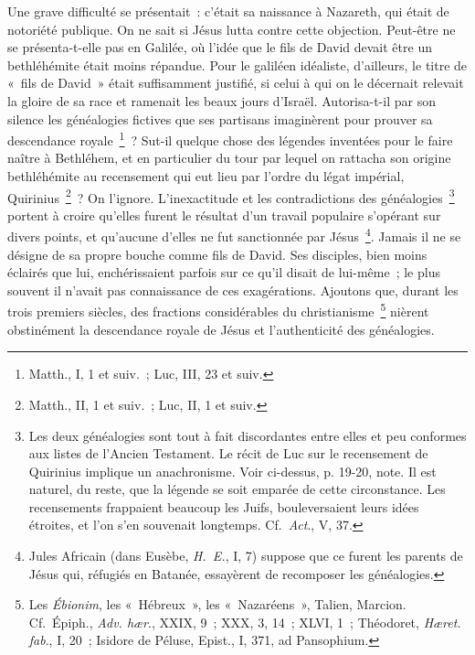 \documentclass[french,twoside]{book} %
\begin{document}
Une grave difficulté se présentait : c’était sa naissance à Nazareth, qui était de notoriété publique. On ne sait si Jésus lutta contre cette objection. Peut-être ne se présenta-t-elle pas en Galilée, où l’idée que le fils de David devait être un bethléhémite était moins répandue. Pour le galiléen idéaliste, d’ailleurs, le titre de « fils de David » était suffisamment justifié, si celui à qui on le décernait relevait la gloire de sa race et ramenait les beaux jours d’Israël. Autorisa-t-il par son silence les généalogies fictives que ses partisans imaginèrent pour prouver sa descendance royale \footnote{Matth., I, 1 et suiv. ; Luc, III, 23 et suiv.} ? Sut-il quelque chose des légendes inventées pour le faire naître à Bethléhem, et en particulier du tour par lequel on rattacha son origine bethléhémite au recensement qui eut lieu par l’ordre du légat impérial, Quirinius \footnote{Matth., II, 1 et suiv. ; Luc, II, 1 et suiv.} ? On l’ignore. L’inexactitude et les contradictions des généalogies \footnote{ Les deux généalogies sont tout à fait discordantes entre elles et peu conformes aux listes de l’Ancien Testament. Le récit de Luc sur le recensement de Quirinius implique un anachronisme. Voir ci-dessus, p. 19-20, note. Il est naturel, du reste, que la légende se soit emparée de cette circonstance. Les recensements frappaient beaucoup les Juifs, bouleversaient leurs idées étroites, et l’on s’en souvenait longtemps. Cf. {\itshape Act}., V, 37.} portent à croire qu’elles furent le résultat d’un travail populaire s’opérant sur divers points, et qu’aucune d’elles ne fut sanctionnée par Jésus \footnote{ Jules Africain (dans Eusèbe, {\itshape H. E.}, I, 7) suppose que ce furent les parents de Jésus qui, réfugiés en Batanée, essayèrent de recomposer les généalogies.}. Jamais il ne se désigne de sa propre bouche comme fils de David. Ses disciples, bien moins éclairés que lui, enchérissaient parfois sur ce qu’il disait de lui-même ; le plus souvent il n’avait pas connaissance de ces exagérations. Ajoutons que, durant les trois premiers siècles, des fractions considérables du christianisme \footnote{ Les {\itshape Ébionim}, les « Hébreux », les « Nazaréens », Talien, Marcion. Cf. Épiph., {\itshape Adv. hær}., XXIX, 9 ; XXX, 3, 14 ; XLVI, 1 ; Théodoret, {\itshape Hæret. fab}., I, 20 ; Isidore de Péluse, Epist., I, 371, ad Pansophium.} nièrent obstinément la descendance royale de Jésus et l’authenticité des généalogies.\par
\end{document}

